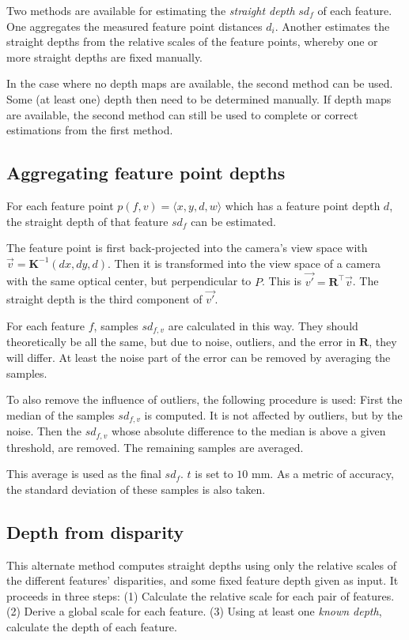 \documentclass[11pt]{scrreprt}
\newcommand{\matr}[1]{\mathbf{#1}}
\newcommand{\transpose}[1]{#1^\intercal}
\begin{document}
Two methods are available for estimating the \emph{straight depth} $sd_f$ of each feature. One aggregates the measured feature point distances $d_i$. Another estimates the straight depths from the relative scales of the feature points, whereby one or more straight depths are fixed manually.

In the case where no depth maps are available, the second method can be used. Some (at least one) depth then need to be determined manually. If depth maps are available, the second method can still be used to complete or correct estimations from the first method.

\subsection{Aggregating feature point depths}
\label{sec:sdepth_from_depth}
For each feature point $p(f,v) = \langle x,y,d,w \rangle$ which has a feature point depth $d$, the straight depth of that feature $sd_{f}$ can be estimated.

The feature point is first back-projected into the camera's view space with $\vec{v} = \matr{K}^{-1} (d x, d y, d)$. Then it is transformed into the view space of a camera with the same optical center, but perpendicular to $P$. This is $\vec{v'} = \transpose{\matr{R}} \vec{v}$. The straight depth is the third component of $\vec{v'}$.

For each feature $f$, samples $sd_{f,v}$ are calculated in this way. They should theoretically be all the same, but due to noise, outliers, and the error in $\matr{R}$, they will differ. At least the noise part of the error can be removed by averaging the samples.

To also remove the influence of outliers, the following procedure is used: First the median of the samples $sd_{f,v}$ is computed. It is not affected by outliers, but by the noise. Then the $sd_{f,v}$ whose absolute difference to the median is above a given threshold, are removed. The remaining samples are averaged.

This average is used as the final $sd_f$. $t$ is set to $10 \text{ mm}$. As a metric of accuracy, the standard deviation of these samples is also taken.

\subsection{Depth from disparity}
This alternate method computes straight depths using only the relative scales of the different features' disparities, and some fixed feature depth given as input. It proceeds in three steps: (1) Calculate the relative scale for each pair of features. (2) Derive a global scale for each feature. (3) Using at least one \emph{known depth}, calculate the depth of each feature.
\end{document}
